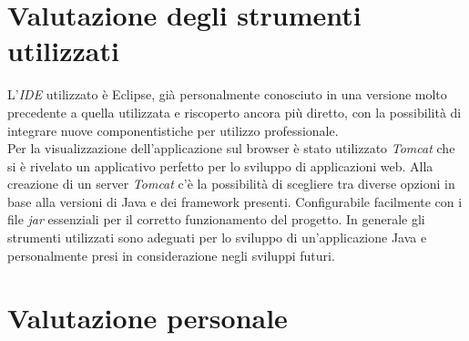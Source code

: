 \section{Valutazione degli strumenti utilizzati}
L'\textit{IDE} utilizzato è Eclipse, già personalmente conosciuto in una versione molto precedente a quella utilizzata e riscoperto ancora più diretto, con la possibilità di integrare nuove componentistiche per utilizzo professionale.\\
Per la visualizzazione dell'applicazione sul browser è stato utilizzato \textit{Tomcat} che si è rivelato un applicativo perfetto per lo sviluppo di applicazioni web. Alla creazione di un server \textit{Tomcat} c'è la possibilità di scegliere tra diverse opzioni in base alla versioni di Java e dei framework presenti. Configurabile facilmente con i file \textit{jar} essenziali per il corretto funzionamento del progetto.
In generale gli strumenti utilizzati sono adeguati per lo sviluppo di un'applicazione Java e personalmente presi in considerazione negli sviluppi futuri.
 
\section{Valutazione personale}
